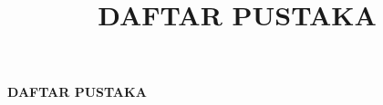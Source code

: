 \documentclass[12pt,a4paper]{article}
\title{\textbf{DAFTAR PUSTAKA}}
\author{}
\date{}
\begin{document}
\begin{center}
    \Large\textbf{DAFTAR PUSTAKA}
\end{center}

\vspace{1cm}


\end{document}

